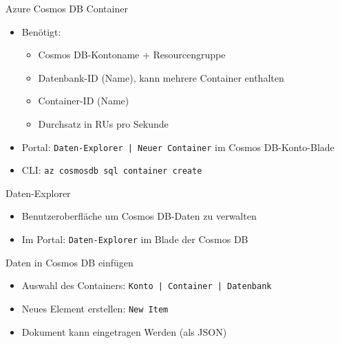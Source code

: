 \begin{flashcard}{Azure Cosmos DB Container}
    \begin{itemize}
        \item Benötigt:
        \begin{itemize}
            \item Cosmos DB-Kontoname + Resourcengruppe
            \item Datenbank-ID (Name), kann mehrere Container enthalten
            \item Container-ID (Name)
            \item Durchsatz in RUs pro Sekunde
        \end{itemize}
        \item Portal: \texttt{Daten-Explorer | Neuer Container} im Cosmos DB-Konto-Blade
        \item CLI:\newline
        \texttt{az cosmosdb sql container create}
    \end{itemize}
\end{flashcard}

\begin{flashcard}[Definition]{Daten-Explorer}
    \begin{itemize}
        \item Benutzeroberfläche um Cosmos DB-Daten zu verwalten
        \item Im Portal: \texttt{Daten-Explorer} im Blade der Cosmos DB
    \end{itemize}
\end{flashcard}

\begin{flashcard}[Definition]{Daten in Cosmos DB einfügen}
    \begin{itemize}
        \item Auswahl des Containers: \texttt{Konto | Container | Datenbank}
        \item Neues Element erstellen: \texttt{New Item}
        \item Dokument kann eingetragen Werden (als JSON)
    \end{itemize}
\end{flashcard}

